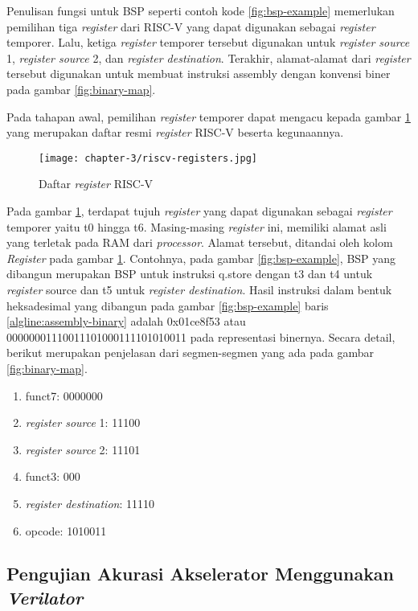 Penulisan fungsi untuk \ac{BSP} seperti contoh kode \ref{fig:bsp-example} memerlukan pemilihan tiga \textit{register} dari RISC-V yang dapat digunakan sebagai \textit{register} temporer. Lalu, ketiga \textit{register} temporer tersebut digunakan untuk \textit{register source} 1, \textit{register source} 2, dan \textit{register destination}. Terakhir, alamat-alamat dari \textit{register} tersebut digunakan untuk membuat instruksi assembly dengan konvensi biner pada gambar \ref{fig:binary-map}.

Pada tahapan awal, pemilihan \textit{register} temporer dapat mengacu kepada gambar \ref{fig:riscv-registers} yang merupakan daftar resmi \textit{register} RISC-V beserta kegunaannya.

\begin{figure}[H]
	\centering
	\texttt{[image: chapter-3/riscv-registers.jpg]}
	\caption{Daftar \textit{register} RISC-V}
	\label{fig:riscv-registers}
\end{figure}

Pada gambar \ref{fig:riscv-registers}, terdapat tujuh \textit{register} yang dapat digunakan sebagai \textit{register} temporer yaitu t0 hingga t6. Masing-masing \textit{register} ini, memiliki alamat asli yang terletak pada \ac{RAM} dari \textit{processor}. Alamat tersebut, ditandai oleh kolom \textit{Register} pada gambar \ref{fig:riscv-registers}. Contohnya, pada gambar \ref{fig:bsp-example}, \ac{BSP} yang dibangun merupakan \ac{BSP} untuk instruksi q.store dengan t3 dan t4 untuk \textit{register} source dan t5 untuk \textit{register destination}. Hasil instruksi dalam bentuk heksadesimal yang dibangun pada gambar \ref{fig:bsp-example} baris \ref{algline:assembly-binary} adalah 0x01ce8f53 atau 00000001110011101000111101010011 pada representasi binernya. Secara detail, berikut merupakan penjelasan dari segmen-segmen yang ada pada gambar \ref{fig:binary-map}.

\begin{enumerate}
	\item funct7: 0000000
	\item \textit{register source} 1: 11100
	\item \textit{register source} 2: 11101
	\item funct3: 000
	\item \textit{register destination}: 11110
	\item opcode: 1010011
\end{enumerate}

\subsection{Pengujian Akurasi Akselerator Menggunakan \textit{Verilator}}
\label{subsec:verilator}

